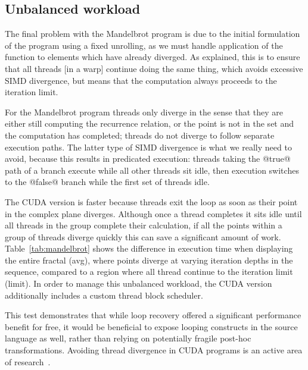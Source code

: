 \subsection{Unbalanced workload}

The final problem with the Mandelbrot program is due to the initial formulation
of the program using a fixed unrolling, as we must handle application of the
function to elements which have already diverged. As explained, this is to
ensure that all threads [in a warp] continue doing the same thing, which avoids
excessive SIMD divergence, but means that the computation always proceeds to the
iteration limit.

For the Mandelbrot program threads only diverge in the sense that they are
either still computing the recurrence relation, or the point is not in the set
and the computation has completed; threads do not diverge to follow separate
execution paths. The latter type of SIMD divergence is what we really need to
avoid, because this results in predicated execution: threads taking the
@true@ path of a branch execute while all other threads sit idle, then
execution switches to the @false@ branch while the first set of threads
idle.

The CUDA version is faster because threads exit the loop as soon as their point
in the complex plane diverges. Although once a thread completes it sits idle
until all threads in the group complete their calculation, if all the points
within a group of threads diverge quickly this can save a significant amount of
work. Table~\ref{tab:mandelbrot} shows the difference in execution time when
displaying the entire fractal (avg), where points diverge at varying iteration
depths in the sequence, compared to a region where all thread continue to the
iteration limit (limit). In order to manage this unbalanced workload, the CUDA
version additionally includes a custom thread block scheduler.

This test demonstrates that while loop recovery offered a significant
performance benefit for free, it would be beneficial to expose looping
constructs in the source language as well, rather than relying on potentially
fragile post-hoc transformations. Avoiding thread divergence in CUDA programs is
an active area of research~\cite{Zhang:2010jc}.


\endinput
\section{N-body gravitational simulation}
\label{sec:nbody}

